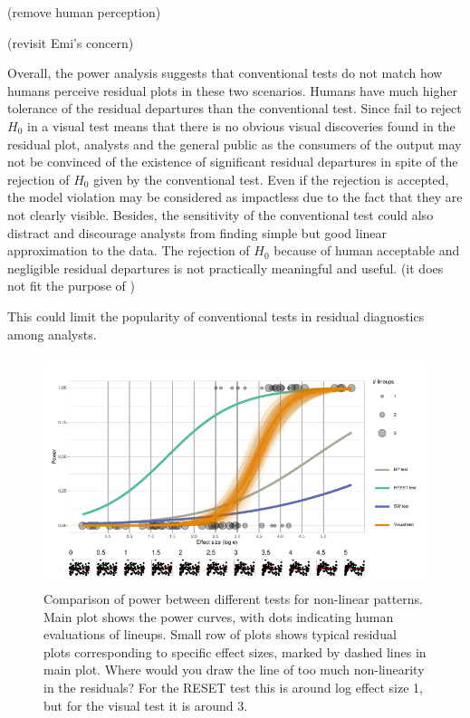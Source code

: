 \documentclass[]{interact}
\theoremstyle{plain}%
\theoremstyle{definition}
\theoremstyle{remark}
\begin{document}
(remove human perception)

(revisit Emi's concern)

Overall, the power analysis suggests that conventional tests do not
match how humans perceive residual plots in these two scenarios. Humans
have much higher tolerance of the residual departures than the
conventional test. Since fail to reject \(H_0\) in a visual test means
that there is no obvious visual discoveries found in the residual plot,
analysts and the general public as the consumers of the output may not
be convinced of the existence of significant residual departures in
spite of the rejection of \(H_0\) given by the conventional test. Even
if the rejection is accepted, the model violation may be considered as
impactless due to the fact that they are not clearly visible. Besides,
the sensitivity of the conventional test could also distract and
discourage analysts from finding simple but good linear approximation to
the data. The rejection of \(H_0\) because of human acceptable and
negligible residual departures is not practically meaningful and useful.
(it does not fit the purpose of )

This could limit the popularity of conventional tests in residual
diagnostics among analysts.

\begin{figure}

{\centering \includegraphics[width=1\linewidth]{paper_comparison_files/figure-latex/polypower-1} 

}

\caption{Comparison of power between different tests for non-linear patterns. Main plot shows the power curves, with dots indicating human evaluations of lineups. Small row of plots shows typical residual plots corresponding to specific effect sizes, marked by dashed lines in main plot. Where would you draw the line of too much non-linearity in the residuals? For the RESET test this is around log effect size 1, but for the visual test it is around 3.}\label{fig:polypower}
\end{figure}
\end{document}

